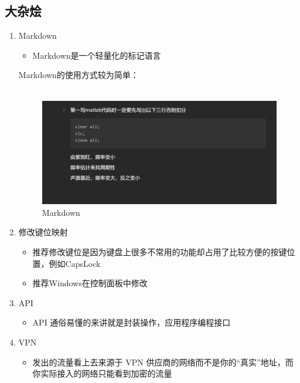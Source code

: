 \documentclass[a4paper, 12pt]{article}
\begin{document}
\subsection{大杂烩}
\begin{enumerate}
  \item{\large Markdown}
    \begin{itemize}
        \item Markdown是一个轻量化的标记语言
    \end{itemize}
    Markdown的使用方式较为简单：\\
    \\
    \begin{figure}
      \centering
      \includegraphics[scale = 0.5]{4.png}
      \caption{Markdown}
      \label{figure}
    \end{figure}
  \item{\large 修改键位映射}
    \begin{itemize}
        \item 推荐修改键位是因为键盘上很多不常用的功能却占用了比较方便的按键位置，例如CapsLock
        \item 推荐Windows在控制面板中修改
    \end{itemize}
  \item{\large API}
    \begin{itemize}
        \item API 通俗易懂的来讲就是封装操作，应用程序编程接口
    \end{itemize}
  \item{\large VPN}
    \begin{itemize}
        \item 发出的流量看上去来源于 VPN 供应商的网络而不是你的“真实”地址，而你实际接入的网络只能看到加密的流量
    \end{itemize}
\end{enumerate}
\end{document}
